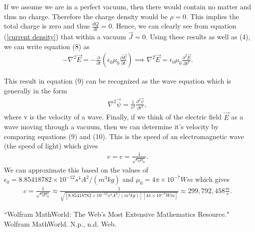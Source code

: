 \documentclass[11pt]{article}
\begin{document}
If we assume we are in a perfect vacuum, then there would contain no matter and thus no charge. Therefore the charge density would be $\rho=0$. This implies the total charge is zero and thus $\frac{dQ}{dt}=0$. Hence, we can clearly see from equation (\ref{current density}) that within a vacuum $\vec{J}=0$. Using these results as well as (4), we can write equation (8) as
\begin{align}
-\nabla^2\vec{E} = -\frac{\partial}{\partial t}\left(\epsilon_0\mu_0\frac{\partial \vec{E}}{\partial t}\right) \implies \nabla^2\vec{E} = \epsilon_0\mu_0\frac{\partial^2 \vec{E}}{\partial t^2}.
\end{align}

This result in equation (9) can be recognized as the wave equation which is generally in the form
\begin{align}
\nabla^2\vec{\psi} = \frac{1}{v^2}\frac{\partial^2 \vec{\psi}}{\partial t^2},
\end{align}
where v is the velocity of a wave. Finally, if we think of the electric field $\vec{E}$ as a wave moving through a vacuum, then we can determine it's velocity by comparing equations (9) and (10). This is the speed of an electromagnetic wave (the speed of light) which gives
\begin{align}
v=c=\frac{1}{\sqrt{\epsilon_0\mu_0}}.
\end{align}
We can approximate this based on the values of $\epsilon_0 = 8.85418782 \times 10^{-12}  s^4 A^2/(m^3 kg)$ and $\mu_0 =4\pi \times 10^{-7} Wm$ which gives
\begin{align}
c=\frac{1}{\sqrt{\epsilon_0\mu_0}} \approx \frac{1}{\sqrt{[8.85418782 \times 10^{-12}  s^4 A^2/(m^3 kg)][4\pi \times 10^{-7} Wm]}} \approx \boxed{299,792,458 \frac{m}{s}}.
\end{align}


\begin{thebibliography}{9}
	 ``Wolfram MathWorld: The Web's Most Extensive Mathematics Resource." Wolfram MathWorld. N.p., n.d. Web. 
\end{thebibliography}


\end{document}

